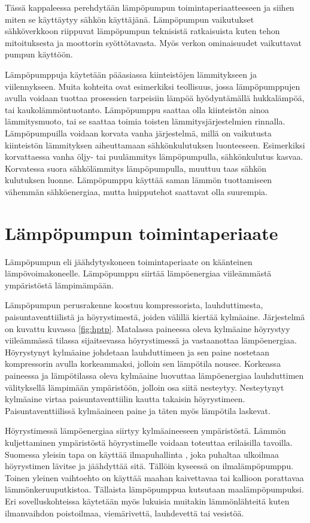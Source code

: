 Tässä kappaleessa perehdytään lämpöpumpun toimintaperiaatteeseen ja siihen miten se käyttäytyy sähkön käyttäjänä. Lämpöpumpun vaikutukset sähköverkkoon riippuvat lämpöpumpun teknisistä ratkaisuista kuten tehon mitoituksesta ja moottorin syöttötavasta. Myös verkon ominaisuudet vaikuttavat pumpun käyttöön.

Lämpöpumppuja käytetään pääasiassa kiinteistöjen lämmitykseen ja viilennykseen. Muita kohteita ovat esimerkiksi teollisuus, jossa lämpöpumppujen avulla voidaan tuottaa prosessien tarpeisiin lämpöä hyödyntämällä hukkalämpöä, tai kaukolämmöntuotanto. \parencite{Setala, katriVala} Lämpöpumppu saattaa olla kiinteistön ainoa lämmitysmuoto, tai se saattaa toimia toisten lämmitysjärjestelmien rinnalla. Lämpöpumpuilla voidaan korvata vanha järjestelmä, millä on vaikutusta kiinteistön lämmityksen aiheuttamaan sähkönkulutuksen luonteeseen. Esimerkiksi korvattaessa vanha öljy- tai puulämmitys lämpöpumpulla, sähkönkulutus kasvaa. Korvatessa suora sähkölämmitys lämpöpumpulla, muuttuu taas sähkön kulutuksen luonne. Lämpöpumppu käyttää saman lämmön tuottamiseen vähemmän sähköenergiaa, mutta huipputehot saattavat olla suurempia.

\section{Lämpöpumpun toimintaperiaate}
  Lämpöpumpun eli jäähdytyskoneen toimintaperiaate on käänteinen lämpövoimakoneelle. Lämpöpumppu siirtää lämpöenergiaa viileämmästä ympäristöstä lämpimämpään. \parencite{DincerRosen}

  Lämpöpumpun perusrakenne koostuu kompressorista, lauhduttimesta, paisuntaventtiilistä ja höyrystimestä, joiden välillä kiertää kylmäaine. Järjestelmä on kuvattu kuvassa \ref{fig:hptp}. Matalassa paineessa oleva kylmäaine höyrystyy viileämmässä tilassa sijaitsevassa höyrystimessä ja vastaanottaa lämpöenergiaa. Höyrystynyt kylmäaine johdetaan lauhduttimeen ja sen paine nostetaan kompressorin avulla korkeammaksi, jolloin sen lämpötila nousee. Korkeassa paineessa ja lämpötilassa oleva kylmäaine luovuttaa lämpöenergiaa lauhduttimen välityksellä lämpimään ympäristöön, jolloin osa siitä nesteytyy. Nesteytynyt kylmäaine virtaa paisuntaventtiilin kautta takaisin höyrystimeen. Paisuntaventtiilissä kylmäaineen paine ja täten myös lämpötila laskevat. \parencite{DincerRosen}

  Höyrystimessä lämpöenergiaa siirtyy kylmäaineeseen ympäristöstä. Lämmön kuljettaminen ympäristöstä höyrystimelle voidaan toteuttaa erilaisilla tavoilla. Suomessa yleisin tapa on käyttää ilmapuhallinta \parencite{sulpu}, joka puhaltaa ulkoilmaa höyrystimen lävitse ja jäähdyttää sitä. Tällöin kyseessä on ilmalämpöpumppu. Toinen yleinen vaihtoehto on käyttää maahan kaivettavaa tai kallioon porattavaa lämmönkeruuputkistoa. Tällaista lämpöpumppua kutsutaan maalämpöpumpuksi. Eri sovelluskohteissa käytetään myös lukuisia muitakin lämmönlähteitä kuten ilmanvaihdon poistoilmaa, viemärivettä, lauhdevettä tai vesistöä. \parencite{DincerRosen}

